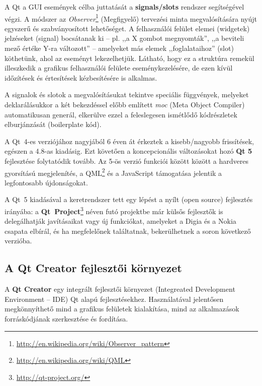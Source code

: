 A Qt a GUI események célba juttatását a \textbf{signals/slots} rendszer segítségével végzi. A módszer az \emph{Observer}\footnote{\url{http://en.wikipedia.org/wiki/Observer_pattern}} (Megfigyelő) tervezési minta megvalósítására nyújt egyszerű és szabványosított lehetőséget. A felhasználói felület elemei (widgetek) jelzéseket (signal) bocsátanak ki -- pl. ,,a X gombot megnyomták'', ,,a beviteli mező értéke Y-ra változott'' -- amelyeket más elemek ,,foglalataihoz'' (slot) köthetünk, ahol az eseményt lekezelhetjük. Látható, hogy ez a struktúra remekül illeszkedik a grafikus felhasználói felülete eseménykezelésére, de ezen kívül időzítések és értesítések kézbesítésére is alkalmas.

A signalok és slotok a megvalósításukat tekintve speciális  függvények, melyeket deklarálásukkor a két bekezdéssel előbb említett \emph{moc} (Meta Object Compiler) automatikusan generál, elkerülve ezzel a feleslegesen ismétlődő kódrészletek elburjánzását (boilerplate kód).

\bigskip

A Qt~4-es verziójához nagyjából 6 éven át érkeztek a kisebb/nagyobb frissítések, egészen a 4.8-as kiadásig. Ezt követően a koncepcionális változásokat hozó \textbf{Qt 5} fejlesztése folytatódik tovább. Az 5-ös verzió funkciói között között a hardveres gyorsítású megjelenítés, a QML\footnote{\url{http://en.wikipedia.org/wiki/QML}} és a JavaScript támogatása jelentik a legfontosabb újdonságokat.

A Qt~5 kiadásával a keretrendszer tett egy lépést a nyílt (open source) fejlesztés irányába: a \textbf{Qt~Project}\footnote{\url{http://qt-project.org/}} néven futó projektbe már külsős fejlesztők is delegálhatják javításaikat vagy új funkciókat, amelyeket a Digia és a Nokia csapata elbírál, és ha megfelelőnek találtatnak, bekerülhetnek a soron következő verzióba.

\subsection{A Qt Creator fejlesztői környezet}\label{sect:qt_creator}

A \textbf{Qt Creator} egy integrált fejlesztői környezet (Integreated Development Environment -- IDE) Qt alapú fejlesztésekhez. Használatával jelentősen megkönnyíthető mind a grafikus felületek kialakítása, mind az alkalmazások forráskódjának szerkesztése és fordítása. \cite{qtcreator_wiki}

